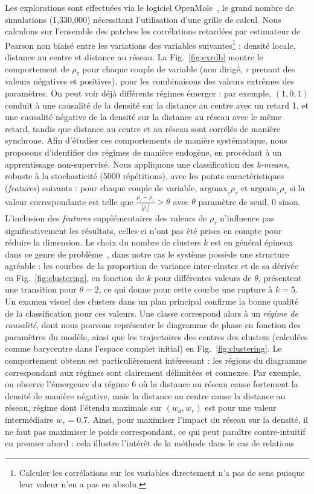 Les explorations sont effectuées via le logiciel OpenMole~\cite{reuillon2013openmole}, le grand nombre de simulations (1,330,000) nécessitant l'utilisation d'une grille de calcul. Nous calculons sur l'ensemble des patches les corrélations retardées par estimateur de Pearson non biaisé entre les variations des variables suivantes\footnote{Calculer les corrélations sur les variables directement n'a pas de sens puisque leur valeur n'en a pas en absolu.} : densité locale, distance au centre et distance au réseau. La Fig.~\ref{fig:exrdb} montre le comportement de $\rho_{\tau}$ pour chaque couple de variable (non dirigé, $\tau$ prenant des valeurs négatives et positives), pour les combinaisons des valeurs extrêmes des paramètres. On peut voir déjà différents régimes émerger : par exemple, $(1,0,1)$ conduit à une causalité de la densité sur la distance au centre avec un retard 1, et une causalité négative de la densité sur la distance au réseau avec le même retard, tandis que distance au centre et au réseau sont corrélés de manière synchrone. Afin d'étudier ces comportements de manière systématique, nous proposons d'identifier des régimes de manière endogène, en procédant à un apprentissage non-supervisé. Nous appliquons une classification des \emph{k-means}, robuste à la stochasticité (5000 répétitions), avec les points caractéristiques (\emph{features}) suivants : pour chaque couple de variable, $\textrm{argmax}_{\tau} \rho_{\tau}$ et $\textrm{argmin}_{\tau} \rho_{\tau}$ si la valeur correspondante est telle que $\frac{\rho_{\tau}-\bar{\rho}_{\tau}}{\left|\bar{\rho}_{\tau}\right|} > \theta$ avec $\theta$ paramètre de seuil, 0 sinon. L'inclusion des \emph{features} supplémentaires des valeurs de $\rho_{\tau}$ n'influence pas significativement les résultats, celles-ci n'ont pas été prises en compte pour réduire la dimension. Le choix du nombre de clusters $k$ est en général épineux dans ce genre de problème~\cite{hamerly2003learning}, dans notre cas le système possède une structure agréable : les courbes de la proportion de variance inter-cluster et de sa dérivée en Fig.~\ref{fig:clustering}, en fonction de $k$ pour différentes valeurs de $\theta$, présentent une transition pour $\theta = 2$, ce qui donne pour cette courbe une rupture à $k=5$. Un examen visuel des clusters dans un plan principal confirme la bonne qualité de la classification pour ces valeurs. Une classe correspond alors à un \emph{régime de causalité}, dont nous pouvons représenter le diagramme de phase en fonction des paramètres du modèle, ainsi que les trajectoires des centres des clusters (calculées comme barycentre dans l'espace complet initial) en Fig.~\ref{fig:clustering}. Le comportement obtenu est particulièrement intéressant : les régions du diagramme correspondant aux régimes sont clairement délimitées et connexes. Par exemple, on observe l'émergence du régime 6 où la distance au réseau cause fortement la densité de manière négative, mais la distance au centre cause la distance au réseau, régime dont l'étendu maximale sur $(w_d,w_r)$ est pour une valeur intermédiaire $w_r=0.7$. Ainsi, pour maximiser l'impact du réseau sur la densité, il ne faut pas maximiser le poids correspondant, ce qui peut paraître contre-intuitif en premier abord : cela illustre l'intérêt de la méthode dans le cas de relations 
